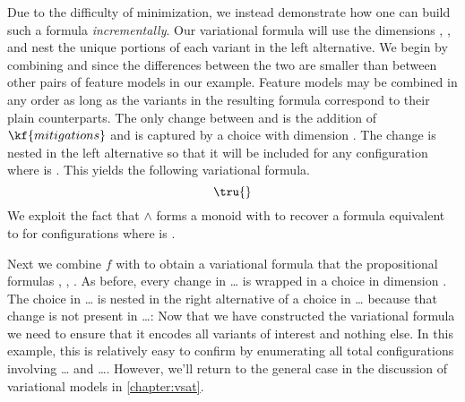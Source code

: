 Due to the difficulty of minimization, we instead demonstrate how one can build
such a formula \emph{incrementally}.
%
Our variational formula will use the dimensions \dimP, \dimQ, \dimR and nest the
unique portions of each variant in the left alternative.
%
We begin by combining \pV{} and \rV{} since the differences between the two are
smaller than between other pairs of feature models in our example. Feature
models may be combined in any order as long as the variants in the resulting
formula correspond to their plain counterparts. The only change between \pV{}
and \rV{} is the addition of $\kf{mitigations}$ and is captured by a choice with
dimension \dimR. The change is nested in the left alternative so that it will be
included for any configuration where \dimR is \true. This yields the following
variational formula.
%
\begin{equation*}
  \tru{}
\end{equation*}
%
%
We exploit the fact that $\wedge$ forms a monoid with \tru{} to recover a
formula equivalent to \pV for configurations where \dimR is \false.

Next we combine $f$ with \qV{} to obtain a variational formula that the
propositional formulas \pV{}, \qV{}, \rV{}. As before, every change
in \ldots{} is wrapped in a choice in dimension \dimQ. The choice in \ldots{} is
nested in the right alternative of a choice in \ldots{} because that change is not
present in \ldots{}:
%
%
Now that we have constructed the variational formula we need to ensure that it
encodes all variants of interest and nothing else. In this example, this is
relatively easy to confirm by enumerating all total configurations involving
\ldots{} and \ldots{}. However, we'll return to the general case in the discussion
of variational models in \autoref{chapter:vsat}.

